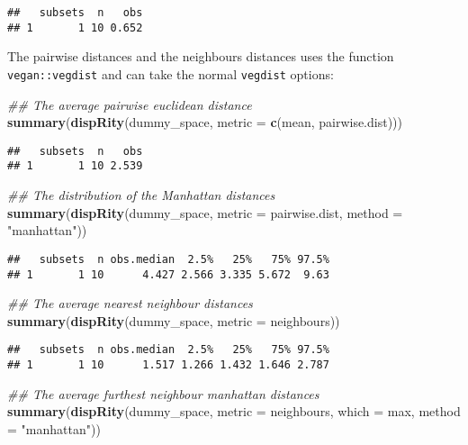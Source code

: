 \documentclass[
]{book}
\newenvironment{Shaded}{\begin{snugshade}}{\end{snugshade}}
\newcommand{\CommentTok}[1]{\textcolor[rgb]{0.56,0.35,0.01}{\textit{#1}}}
\newcommand{\DataTypeTok}[1]{\textcolor[rgb]{0.13,0.29,0.53}{#1}}
\newcommand{\KeywordTok}[1]{\textcolor[rgb]{0.13,0.29,0.53}{\textbf{#1}}}
\newcommand{\NormalTok}[1]{#1}
\newcommand{\StringTok}[1]{\textcolor[rgb]{0.31,0.60,0.02}{#1}}
\begin{document}
\begin{verbatim}
##   subsets  n   obs
## 1       1 10 0.652
\end{verbatim}

The pairwise distances and the neighbours distances uses the function \texttt{vegan::vegdist} and can take the normal \texttt{vegdist} options:

\begin{Shaded}
\begin{Highlighting}[]
\CommentTok{\#\# The average pairwise euclidean distance}
\KeywordTok{summary}\NormalTok{(}\KeywordTok{dispRity}\NormalTok{(dummy\_space, }\DataTypeTok{metric =} \KeywordTok{c}\NormalTok{(mean, pairwise.dist)))}
\end{Highlighting}
\end{Shaded}

\begin{verbatim}
##   subsets  n   obs
## 1       1 10 2.539
\end{verbatim}

\begin{Shaded}
\begin{Highlighting}[]
\CommentTok{\#\# The distribution of the Manhattan distances}
\KeywordTok{summary}\NormalTok{(}\KeywordTok{dispRity}\NormalTok{(dummy\_space, }\DataTypeTok{metric =}\NormalTok{ pairwise.dist,}
                 \DataTypeTok{method =} \StringTok{"manhattan"}\NormalTok{))}
\end{Highlighting}
\end{Shaded}

\begin{verbatim}
##   subsets  n obs.median  2.5%   25%   75% 97.5%
## 1       1 10      4.427 2.566 3.335 5.672  9.63
\end{verbatim}

\begin{Shaded}
\begin{Highlighting}[]
\CommentTok{\#\# The average nearest neighbour distances}
\KeywordTok{summary}\NormalTok{(}\KeywordTok{dispRity}\NormalTok{(dummy\_space, }\DataTypeTok{metric =}\NormalTok{ neighbours))}
\end{Highlighting}
\end{Shaded}

\begin{verbatim}
##   subsets  n obs.median  2.5%   25%   75% 97.5%
## 1       1 10      1.517 1.266 1.432 1.646 2.787
\end{verbatim}

\begin{Shaded}
\begin{Highlighting}[]
\CommentTok{\#\# The average furthest neighbour manhattan distances}
\KeywordTok{summary}\NormalTok{(}\KeywordTok{dispRity}\NormalTok{(dummy\_space, }\DataTypeTok{metric =}\NormalTok{ neighbours,}
                 \DataTypeTok{which =}\NormalTok{ max, }\DataTypeTok{method =} \StringTok{"manhattan"}\NormalTok{))}
\end{Highlighting}
\end{Shaded}
\end{document}
